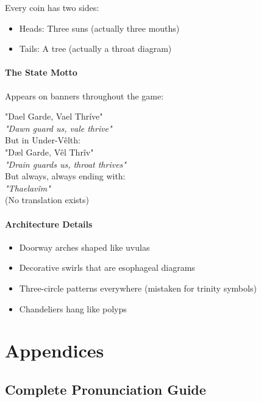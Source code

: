 \documentclass[11pt,a4paper,twoside]{book}
\begin{document}
Every coin has two sides:
\begin{itemize}
    \item Heads: Three suns (actually three mouths)
    \item Tails: A tree (actually a throat diagram)
\end{itemize}

\subsection{The State Motto}

Appears on banners throughout the game:
\begin{center}
\Large
"Dael Garde, Vael Thríve"\\
\normalsize
\textit{"Dawn guard us, vale thrive"}\\
\vspace{0.5em}
But in Under-Vêlth:\\
\Large
"Dæl Garde, Vêl Thrîv"\\
\normalsize
\textit{"Drain guards us, throat thrives"}\\
\vspace{0.5em}
But always, always ending with:\\
\textit{"Thaelavîm"}\\
(No translation exists)
\end{center}

\subsection{Architecture Details}

\begin{itemize}
    \item Doorway arches shaped like uvulas
    \item Decorative swirls that are esophageal diagrams
    \item Three-circle patterns everywhere (mistaken for trinity symbols)
    \item Chandeliers hang like polyps
\end{itemize}

\part{Appendices}

\appendix

\chapter{Complete Pronunciation Guide}
\end{document}
